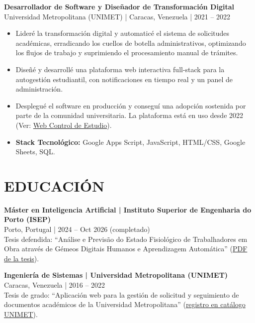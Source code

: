 \documentclass[10pt,a4paper]{article}
\begin{document}
\par\addvspace{\baselineskip}
\textbf{\large Desarrollador de Software y Diseñador de Transformación Digital}\\
Universidad Metropolitana (UNIMET) | Caracas, Venezuela | 2021 -- 2022
\begin{itemize}
    \item Lideré la transformación digital y automaticé el sistema de solicitudes académicas, erradicando los cuellos de botella administrativos, optimizando los flujos de trabajo y suprimiendo el procesamiento manual de trámites.
    \item Diseñé y desarrollé una plataforma web interactiva full-stack para la autogestión estudiantil, con notificaciones en tiempo real y un panel de administración.
    \item Desplegué el software en producción y conseguí una adopción sostenida por parte de la comunidad universitaria. La plataforma está en uso desde 2022 (Ver: \href{https://script.google.com/macros/s/AKfycbw3h26r_mjt0jow79RT9dnPaUKZ81dVUsF8qDeEjp7wsRg-ldqHjlB9L0FJYP_Uc_LXUw/exec}{Web Control de Estudio}).
    \item \textbf{Stack Tecnológico:} Google Apps Script, JavaScript, HTML/CSS, Google Sheets, SQL.
\end{itemize}

\section*{EDUCACIÓN}

\textbf{Máster en Inteligencia Artificial | Instituto Superior de Engenharia do Porto (ISEP)}\\
Porto, Portugal | 2024 -- Oct 2026 (completado)\\
Tesis defendida: ``Análise e Previsão do Estado Fisiológico de Trabalhadores em Obra através de Gémeos Digitais Humanos e Aprendizagem Automática'' (\href{https://drive.google.com/file/d/1xlqiDRtNX2Xj5_9TnHy6inUlAnseSHbF/view?usp=drive\_link}{PDF de la tesis}).

\textbf{Ingeniería de Sistemas | Universidad Metropolitana (UNIMET)}\\
Caracas, Venezuela | 2016 -- 2022\\
Tesis de grado: ``Aplicación web para la gestión de solicitud y seguimiento de documentos académicos de la Universidad Metropolitana'' (\href{https://unimet.ent.sirsi.net/client/es_ES/default/search/detailnonmodal/ent:\%24002f\%24002fSD\_ILS\%24002f0\%24002fSD\_ILS:132264/one}{registro en catálogo UNIMET}).
\end{document}
